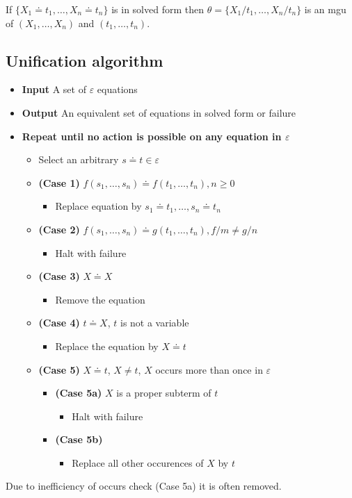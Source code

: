\documentclass{article}
\begin{document}
If  $\{X_1\doteq t_1,\ldots,X_n\doteq t_n\}$ is in solved form then $\theta=\{X_1/t_1,\ldots,X_n/t_n\}$ is an mgu of $(X_1,\ldots,X_n)$ and $(t_1,\ldots,t_n)$.

\subsection{Unification algorithm}
\begin{itemize}
    \item \textbf{Input} A set of $\varepsilon$ equations
    \item \textbf{Output} An equivalent set of equations in solved form or failure
    \item \textbf{Repeat until no action is possible on any equation in $\varepsilon$}
    \begin{itemize}
        \item Select an arbitrary $s\doteq t\in\varepsilon$
        \item \textbf{(Case 1)} $f(s_1,\ldots,s_n)\doteq f(t_1,\ldots,t_n), n\geq0$
        \begin{itemize}
            \item Replace equation by $s_1\doteq t_1,\ldots,s_n\doteq t_n$
        \end{itemize}
        \item \textbf{(Case 2)} $f(s_1,\ldots,s_n)\doteq g(t_1,\ldots,t_n), f/m\not=g/n$
        \begin{itemize}
            \item Halt with failure
        \end{itemize}
        \item \textbf{(Case 3)} $X\doteq X$
        \begin{itemize}
            \item Remove the equation
        \end{itemize}
        \item \textbf{(Case 4)} $t\doteq X$, $t$ is not a variable
        \begin{itemize}
            \item Replace the equation by $X\doteq t$
        \end{itemize}
        \item \textbf{(Case 5)} $X\doteq t$, $X\not=t$, $X$ occurs more than once in $\varepsilon$
        \begin{itemize}
            \item \textbf{(Case 5a)} $X$ is a proper subterm of $t$
            \begin{itemize}
                \item Halt with failure
            \end{itemize}
            \item \textbf{(Case 5b)} 
            \begin{itemize}
                \item Replace all other occurences of $X$ by $t$
            \end{itemize}
        \end{itemize}
    \end{itemize}
\end{itemize}
Due to inefficiency of occurs check (Case 5a) it is often removed.
\end{document}
